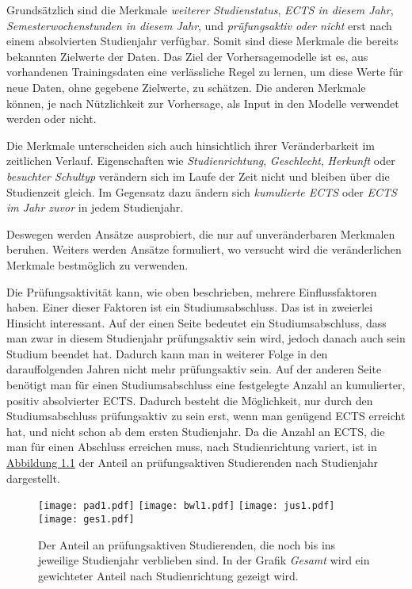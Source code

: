 Grunds\"atzlich sind die Merkmale \textit{\glqq weiterer Studienstatus\grqq{}},
\textit{\glqq ECTS in diesem Jahr\grqq{}}, \textit{\glqq Semesterwochenstunden in diesem Jahr\grqq{}}, und
\textit{\glqq pr\"ufungsaktiv oder nicht\grqq{}} erst nach einem absolvierten Studienjahr verf\"ugbar. Somit sind diese Merkmale
die bereits bekannten Zielwerte der Daten. Das Ziel der Vorhersagemodelle ist es, aus vorhandenen Trainingsdaten eine verl\"assliche
Regel zu lernen, um diese Werte f\"ur neue Daten, ohne gegebene Zielwerte, zu
sch\"atzen. Die anderen Merkmale k\"onnen, je nach N\"utzlichkeit zur Vorhersage, als Input
in den Modelle verwendet werden oder nicht.

Die Merkmale unterscheiden sich auch hinsichtlich ihrer Ver\"anderbarkeit im zeitlichen Verlauf. Eigenschaften wie \textit{\glqq Studienrichtung\grqq{}},
\textit{\glqq Geschlecht\grqq{}}, \textit{\glqq Herkunft\grqq{}} oder \textit{\glqq besuchter Schultyp\grqq{}} ver\"andern sich im Laufe der Zeit nicht und bleiben \"uber die Studienzeit gleich.
Im Gegensatz dazu \"andern sich \textit{\glqq kumulierte ECTS\grqq{}} oder \textit{\glqq ECTS im Jahr zuvor\grqq{}} in jedem Studienjahr.

Deswegen werden Ans\"atze ausprobiert, die nur auf unver\"anderbaren Merkmalen beruhen. Weiters werden Ans\"atze formuliert, wo versucht wird
die ver\"anderlichen Merkmale bestm\"oglich zu verwenden.

Die Pr\"ufungsaktivit\"at kann, wie oben beschrieben, mehrere Einflussfaktoren haben. Einer dieser Faktoren ist ein Studiumsabschluss. Das ist in zweierlei Hinsicht interessant.
Auf der einen Seite bedeutet ein Studiumsabschluss, dass man zwar in diesem Studienjahr pr\"ufungsaktiv sein wird, jedoch danach auch sein Studium beendet hat.
Dadurch kann man in weiterer Folge in den darauffolgenden Jahren nicht mehr pr\"ufungsaktiv sein.
Auf der anderen Seite ben\"otigt man f\"ur einen Studiumsabschluss eine festgelegte Anzahl an kumulierter, positiv absolvierter ECTS. Dadurch besteht die
M\"oglichkeit, nur durch den Studiumsabschluss pr\"ufungsaktiv zu sein erst, wenn man gen\"ugend ECTS erreicht hat, und nicht schon ab dem ersten Studienjahr.
Da die Anzahl an ECTS, die man f\"ur einen Abschluss erreichen muss, nach Studienrichtung variert, ist in \hyperref[fig:abb1]{Abbildung 1.1}
der Anteil an pr\"ufungsaktiven Studierenden nach Studienjahr dargestellt.

\begin{figure}[ht]
  \label{fig:abb1}
  \texttt{[image: pad1.pdf]}
  \texttt{[image: bwl1.pdf]}
  \texttt{[image: jus1.pdf]}
  \texttt{[image: ges1.pdf]}
  \caption[Anteil an pr\"ufungsaktiven Studierenden nach Studienjahr und -richtung]{Der Anteil an pr\"ufungsaktiven Studierenden, die noch bis ins jeweilige
    Studienjahr verblieben sind. In der Grafik \textit{Gesamt} wird ein gewichteter
    Anteil nach Studienrichtung gezeigt wird.}
\end{figure}

